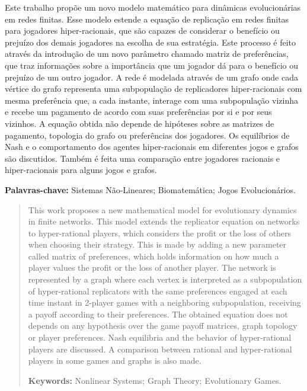 \documentclass[masters]{./config/PPGMAp}
\theoremstyle{definition}
\begin{document}
	\begin{resumo}
		Este trabalho propõe um novo modelo matemático para dinâmicas evolucionárias em redes finitas. Esse modelo estende a equação de replicação em redes finitas para jogadores hiper-racionais, que são capazes de considerar o benefício ou prejuízo dos demais jogadores na escolha de sua estratégia. Este processo é feito através da introdução de um novo parâmetro chamado matriz de preferências, que traz informações sobre a importância que um jogador dá para o benefício ou prejuízo de um outro jogador. A rede é modelada através de um grafo onde cada vértice do grafo representa uma subpopulação de replicadores hiper-racionais com mesma preferência que, a cada instante, interage com uma subpopulação vizinha e recebe um pagamento de acordo com suas preferências por si e por seus vizinhos. A equação obtida não depende de hipóteses sobre as matrizes de pagamento, topologia do grafo ou preferências dos jogadores. Os equilíbrios de Nash e o comportamento dos agentes hiper-racionais em diferentes jogos e grafos são discutidos. Também é feita uma comparação entre jogadores racionais e hiper-racionais para alguns jogos e grafos.
		
		\noindent \textbf{Palavras-chave:} Sistemas Não-Lineares; Biomatemática; Jogos Evolucionários.
	\end{resumo}

	\begin{abstract}
	    This work proposes a new mathematical model for evolutionary dynamics in finite networks. This model extends the replicator equation on networks to hyper-rational players, which considers the profit or the loss of others when choosing their strategy. This is made by adding a new parameter called matrix of preferences, which holds information on how much a player values the profit or the loss of another player. The network is represented by a graph where each vertex is interpreted as a subpopulation of hyper-rational replicators with the same preferences engaged at each time instant in 2-player games with a neighboring subpopulation, receiving a payoff according to their preferences. The obtained equation does not depends on any hypothesis over the game payoff matrices, graph topology or player preferences. Nash equilibria and the behavior of hyper-rational players are discussed. A comparison between rational and hyper-rational players in some games and graphs is also made.
		
		\noindent \textbf{Keywords:} Nonlinear Systems; Graph Theory; Evolutionary Games.
	\end{abstract}
\end{document}
